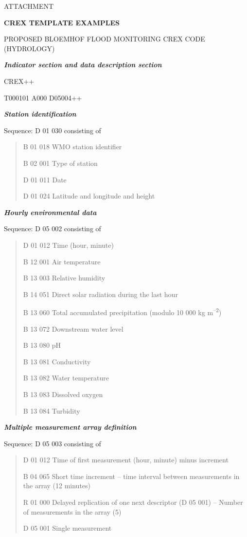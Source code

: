 ATTACHMENT

\textbf{CREX TEMPLATE EXAMPLES}

PROPOSED BLOEMHOF FLOOD MONITORING CREX CODE (HYDROLOGY)

\emph{\textbf{Indicator section and data description section}}

CREX++

T000101 A000 D05004++

\emph{\textbf{Station identification}}

Sequence: D 01 030 consisting of

\begin{quote}
B 01 018 WMO station identifier

B 02 001 Type of station

D 01 011 Date

D 01 024 Latitude and longitude and height
\end{quote}

\emph{\textbf{Hourly environmental data}}

Sequence: D 05 002 consisting of

\begin{quote}
D 01 012 Time (hour, minute)

B 12 001 Air temperature

B 13 003 Relative humidity

B 14 051 Direct solar radiation during the last hour

B 13 060 Total accumulated precipitation (modulo 10 000 kg m\textsuperscript{--2})

B 13 072 Downstream water level

B 13 080 pH

B 13 081 Conductivity

B 13 082 Water temperature

B 13 083 Dissolved oxygen

B 13 084 Turbidity
\end{quote}

\emph{\textbf{Multiple measurement array definition}}

Sequence: D 05 003 consisting of

\begin{quote}
D 01 012 Time of first measurement (hour, minute) minus increment

B 04 065 Short time increment -- time interval between measurements in the array (12 minutes)

R 01 000 Delayed replication of one next descriptor (D 05 001) -- Number of measurements in the array (5)

D 05 001 Single measurement
\end{quote}

